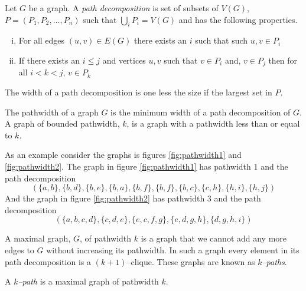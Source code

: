 \begin{definition}
    Let $G$ be a graph. A \textit{path decomposition} is set of subsets of $V(G)$, $P=(P_1,P_2,\dots,P_n)$ such that $\bigcup_{i} P_i=V(G)$ and has the following properties.    
    \begin{enumerate}[(i)]
        \item For all edges $(u,v) \in E(G)$ there exists an $i$ such that such $u,v\in P_i$
        \item If there exists an $i\leq j$ and vertices $u,v$ such that $v\in P_i$ and, $v\in P_j$ then for all $i<k<j$, $v\in P_k$
    \end{enumerate}
    The width of a path decomposition is one less the size if the largest set in $P$.
\end{definition}

\begin{definition}[Pathwidth]
    The pathwidth of a graph $G$ is the minimum width of a path decomposition of $G$.    
    A graph of bounded pathwidth, $k$, is a graph with a pathwidth less than or equal to $k$. 
\end{definition}

As an example consider the graphs is figures \ref{fig:pathwidth1} and \ref{fig:pathwidth2}. The graph in figure \ref{fig:pathwidth1} has pathwidth 1 and the path decomposition
\[(\{a,b\},\{b,d\},\{b,e\},\{b,a\},\{b,f\},\{b,f\},\{b,c\},\{c,h\},\{h,i\},\{h,j\})\]
And the graph in figure \ref{fig:pathwidth2} has pathwidth 3 and the path decomposition 
\[(\{a,b,c,d\},\{c,d,e\},\{e,c,f,g\},\{e,d,g,h\},\{d,g,h,i\})\] 

A maximal graph, $G$, of pathwidth $k$ is a graph that we cannot add any more edges to $G$ without increasing its pathwidth. In such a graph every element in its path decomposition is a $(k+1)$--clique. These graphs are known as \textit{$k$--paths}.
\begin{definition}[$k$--path]
    A \textit{$k$--path} is a maximal graph of pathwidth $k$.
\end{definition}

